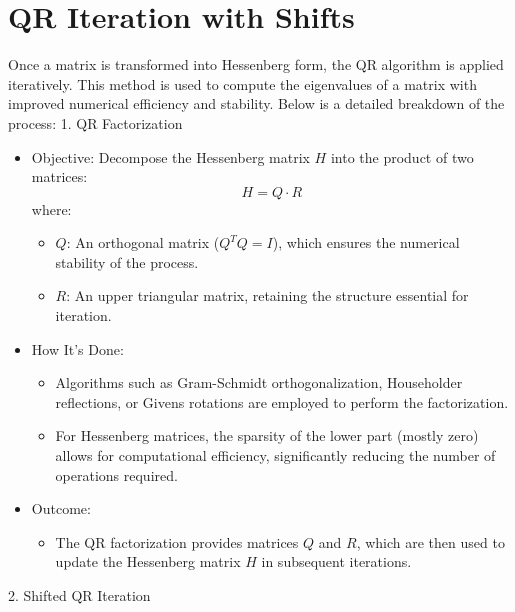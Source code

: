 \documentclass[a4paper,11pt,oneside]{report}
\begin{document}
\section{ QR Iteration with Shifts}

Once a matrix is transformed into Hessenberg form, the QR algorithm is applied iteratively. This method is used to compute the eigenvalues of a matrix with improved numerical efficiency and stability. Below is a detailed breakdown of the process:
 1. QR Factorization
 \begin{itemize}

   \item Objective: Decompose the Hessenberg matrix \( H \) into the product of two matrices:
     \[
     H = Q \cdot R
     \]
     where:
     \begin{itemize}
     \item \( Q \): An orthogonal matrix (\( Q^T Q = I \)), which ensures the numerical stability of the process.
     \item \( R \): An upper triangular matrix, retaining the structure essential for iteration.
\end{itemize}
   \item How It’s Done: 
   \begin{itemize}
     \item Algorithms such as Gram-Schmidt orthogonalization, Householder reflections, or Givens rotations are employed to perform the factorization.
     \item For Hessenberg matrices, the sparsity of the lower part (mostly zero) allows for computational efficiency, significantly reducing the number of operations required.
\end{itemize}
   \item Outcome:
   \begin{itemize}
       \item The QR factorization provides matrices \( Q \) and \( R \), which are then used to update the Hessenberg matrix \( H \) in subsequent iterations.
   \end{itemize}
   \end{itemize}
 2. Shifted QR Iteration
\end{document}
